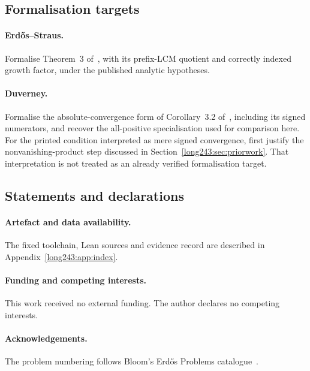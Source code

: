 \documentclass[11pt]{article}
\begin{document}
\subsection*{Formalisation targets}

\paragraph{Erd\H{o}s--Straus.}
Formalise Theorem~3 of~\cite{erdosstraus1964}, with its prefix-LCM quotient
and correctly indexed growth factor, under the published analytic hypotheses.

\paragraph{Duverney.}
Formalise the absolute-convergence form of Corollary~3.2
of~\cite{duverney2001}, including its signed numerators, and recover the
all-positive specialisation used for comparison here. For the printed
condition interpreted as mere signed convergence, first justify the
nonvanishing-product step discussed in
Section~\ref{long243:sec:priorwork}. That interpretation is not treated
as an already verified formalisation target.

\subsection*{Statements and declarations}

\paragraph{Artefact and data availability.} The fixed toolchain,
Lean sources and evidence record are described in
Appendix~\ref{long243:app:index}.

\paragraph{Funding and competing interests.} This work received no external
funding.  The author declares no competing interests.

\paragraph{Acknowledgements.} The problem numbering follows
Bloom's Erd\H{o}s Problems catalogue~\cite{erdosproblems}.

\appendix
\end{document}
